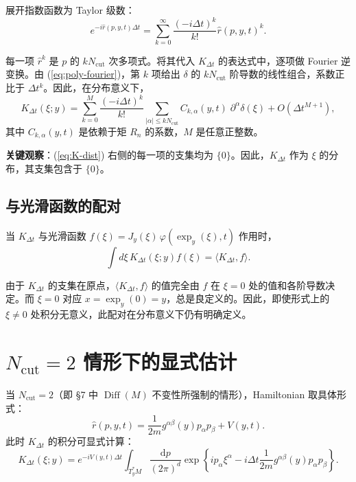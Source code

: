 \documentclass{book}
\newcommand{\mathd}{\mathrm{d}}
\newcommand{\mathpi}{\pi}
\begin{document}
展开指数函数为 Taylor 级数：
\begin{equation}
  e^{-i \hat{r}(p, y, t) \Delta t} = \sum_{k=0}^\infty \frac{(-i \Delta t)^k}{k!} \hat{r}(p, y, t)^k. \label{eq:taylor-expand}
\end{equation}

每一项 $\hat{r}^k$ 是 $p$ 的 $k N_{\mathrm{cut}}$ 次多项式。将其代入 $K_{\Delta t}$ 的表达式中，逐项做 Fourier 逆变换。由 (\ref{eq:poly-fourier})，第 $k$ 项给出 $\delta$ 的 $k N_{\mathrm{cut}}$ 阶导数的线性组合，系数正比于 $\Delta t^k$。因此，在分布意义下，
\begin{equation}
  K_{\Delta t}(\xi; y) = \sum_{k=0}^{M} \frac{(-i \Delta t)^k}{k!} \sum_{|\alpha| \le k N_{\mathrm{cut}}} C_{k, \alpha}(y, t) \; \partial^\alpha \delta(\xi) + O(\Delta t^{M+1}), \label{eq:K-dist}
\end{equation}
其中 $C_{k, \alpha}(y, t)$ 是依赖于矩 $R_n$ 的系数，$M$ 是任意正整数。

{\bfseries 关键观察}：(\ref{eq:K-dist}) 右侧的每一项的支集均为 $\{0\}$。因此，$K_{\Delta t}$ 作为 $\xi$ 的分布，其支集包含于 $\{0\}$。

\subsection{与光滑函数的配对}

当 $K_{\Delta t}$ 与光滑函数 $f(\xi) = J_y(\xi) \, \varphi(\exp_y(\xi), t)$ 作用时，
\[
\int d\xi \, K_{\Delta t}(\xi; y) f(\xi) = \langle K_{\Delta t}, f \rangle.
\]

由于 $K_{\Delta t}$ 的支集在原点，$\langle K_{\Delta t}, f \rangle$ 的值完全由 $f$ 在 $\xi=0$ 处的值和各阶导数决定。而 $\xi=0$ 对应 $x = \exp_y(0) = y$，总是良定义的。因此，即使形式上的 $\xi \neq 0$ 处积分无意义，此配对在分布意义下仍有明确定义。

\section{$N_{\mathrm{cut}}=2$ 情形下的显式估计}

当 $N_{\mathrm{cut}}=2$（即 §7 中 $\operatorname{Diff}(M)$ 不变性所强制的情形），Hamiltonian 取具体形式：
\[
\hat{r}(p, y, t) = \frac{1}{2m} g^{\alpha\beta}(y) p_\alpha p_\beta + V(y, t).
\]
此时 $K_{\Delta t}$ 的积分可显式计算：
\[
K_{\Delta t}(\xi; y) = e^{-i V(y,t) \Delta t} \int_{T_y^*M} \frac{\mathd p}{(2\mathpi)^d} \exp\left\{ i p_\alpha \xi^\alpha - i \Delta t \frac{1}{2m} g^{\alpha\beta}(y) p_\alpha p_\beta \right\}.
\]
\end{document}
